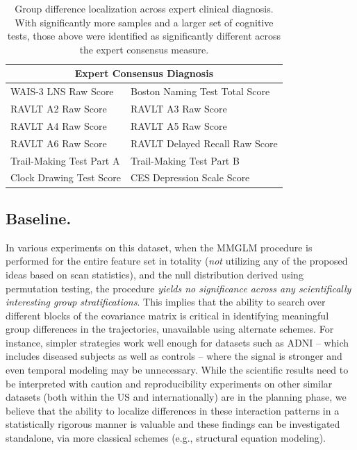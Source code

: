 \begin{table}
	\small
	\centering
	\begin{tabular}{ll}
		\toprule
		\multicolumn{2}{c}{\textbf{Expert Consensus Diagnosis}}\\ \midrule \midrule
		WAIS-3 LNS Raw Score &
		Boston Naming Test Total Score \\
		RAVLT A2 Raw Score &
		RAVLT A3 Raw Score \\
		RAVLT A4 Raw Score &
		RAVLT A5 Raw Score \\
		RAVLT A6 Raw Score &
		RAVLT Delayed Recall Raw Score \\
		Trail-Making Test Part A &
		Trail-Making Test Part B \\
		Clock Drawing Test Score &
		CES Depression Scale Score \\
		\bottomrule
		\bottomrule
	\end{tabular}
	\caption[Localized results across expert clinical diagnosis]{Group difference localization across expert clinical diagnosis. With significantly more samples and a larger set of cognitive tests, those above were identified as significantly different across the expert consensus measure.}
	\label{tab:wrapCC}
\end{table}

\subsection{Baseline.}

In various experiments on this dataset, when the MMGLM procedure is performed for the entire feature set in totality ({\em not} 
utilizing any of the proposed ideas based on scan statistics), 
and the null distribution derived using permutation testing, the procedure {\em yields no significance across \textit{any} 
scientifically interesting group stratifications}. 
This implies that the ability to search over different blocks of the covariance matrix is critical in identifying meaningful group differences 
in the trajectories, unavailable 
using alternate schemes. For instance, simpler strategies work well enough for datasets such as ADNI -- 
  which includes diseased subjects as well as controls -- 
  where the signal is stronger and even temporal modeling may be unnecessary.
  While the scientific results need to be interpreted with caution and reproducibility experiments on 
other similar datasets (both within the US and internationally) are in the planning phase, 
we believe that the ability to localize 
differences in these interaction patterns in a statistically rigorous manner is valuable and these findings can be investigated standalone, via 
more classical schemes (e.g., structural equation modeling). 


